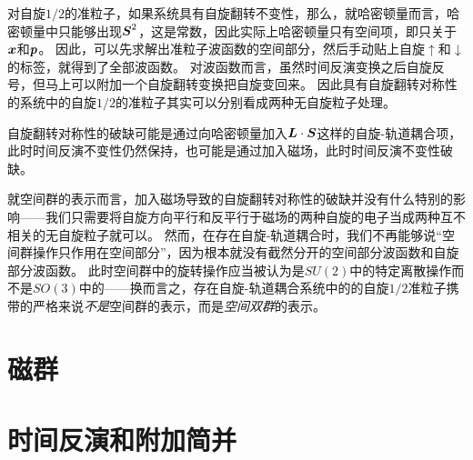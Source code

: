 对自旋$1/2$的准粒子，如果系统具有自旋翻转不变性，那么，就哈密顿量而言，哈密顿量中只能够出现$\vb*{S}^2$，这是常数，因此实际上哈密顿量只有空间项，即只关于$\vb*{x}$和$\vb*{p}$。
因此，可以先求解出准粒子波函数的空间部分，然后手动贴上自旋$\uparrow$和$\downarrow$的标签，就得到了全部波函数。
对波函数而言，虽然时间反演变换之后自旋反号，但马上可以附加一个自旋翻转变换把自旋变回来。
因此具有自旋翻转对称性的系统中的自旋$1/2$的准粒子其实可以分别看成两种无自旋粒子处理。

自旋翻转对称性的破缺可能是通过向哈密顿量加入$\vb*{L} \cdot \vb*{S}$这样的自旋-轨道耦合项，此时时间反演不变性仍然保持，也可能是通过加入磁场，此时时间反演不变性破缺。

就空间群的表示而言，加入磁场导致的自旋翻转对称性的破缺并没有什么特别的影响——我们只需要将自旋方向平行和反平行于磁场的两种自旋的电子当成两种互不相关的无自旋粒子就可以。
然而，在存在自旋-轨道耦合时，我们不再能够说“空间群操作只作用在空间部分”，因为根本就没有截然分开的空间部分波函数和自旋部分波函数。
此时空间群中的旋转操作应当被认为是$SU(2)$中的特定离散操作而不是$SO(3)$中的——换而言之，存在自旋-轨道耦合系统中的的自旋$1/2$准粒子携带的严格来说\emph{不是}空间群的表示，而是\emph{空间双群}的表示。


\section{磁群}

\section{时间反演和附加简并} %

